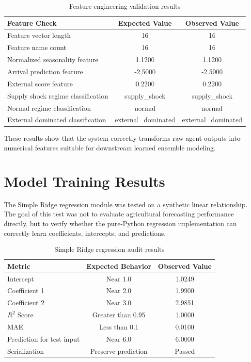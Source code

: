 \documentclass[12pt,a4paper]{report}
\begin{document}
\begin{table}[H]
\centering
\caption{Feature engineering validation results}
\label{tab:feature_engineering_results}
\begin{tabular}{|p{6cm}|c|c|}
\hline
\textbf{Feature Check} & \textbf{Expected Value} & \textbf{Observed Value} \\
\hline
Feature vector length & 16 & 16 \\
\hline
Feature name count & 16 & 16 \\
\hline
Normalized seasonality feature & 1.1200 & 1.1200 \\
\hline
Arrival prediction feature & -2.5000 & -2.5000 \\
\hline
External score feature & 0.2200 & 0.2200 \\
\hline
Supply shock regime classification & supply\_shock & supply\_shock \\
\hline
Normal regime classification & normal & normal \\
\hline
External dominated classification & external\_dominated & external\_dominated \\
\hline
\end{tabular}
\end{table}

These results show that the system correctly transforms raw agent outputs into numerical features suitable for downstream learned ensemble modeling.

\section{Model Training Results}

The Simple Ridge regression module was tested on a synthetic linear relationship. The goal of this test was not to evaluate agricultural forecasting performance directly, but to verify whether the pure-Python regression implementation can correctly learn coefficients, intercepts, and predictions.

\begin{table}[H]
\centering
\caption{Simple Ridge regression audit results}
\label{tab:ridge_results}
\begin{tabular}{|p{5cm}|c|c|}
\hline
\textbf{Metric} & \textbf{Expected Behavior} & \textbf{Observed Value} \\
\hline
Intercept & Near 1.0 & 1.0249 \\
\hline
Coefficient 1 & Near 2.0 & 1.9900 \\
\hline
Coefficient 2 & Near 3.0 & 2.9851 \\
\hline
$R^2$ Score & Greater than 0.95 & 1.0000 \\
\hline
MAE & Less than 0.1 & 0.0100 \\
\hline
Prediction for test input & Near 6.0 & 6.0000 \\
\hline
Serialization & Preserve prediction & Passed \\
\hline
\end{tabular}
\end{table}
\end{document}
